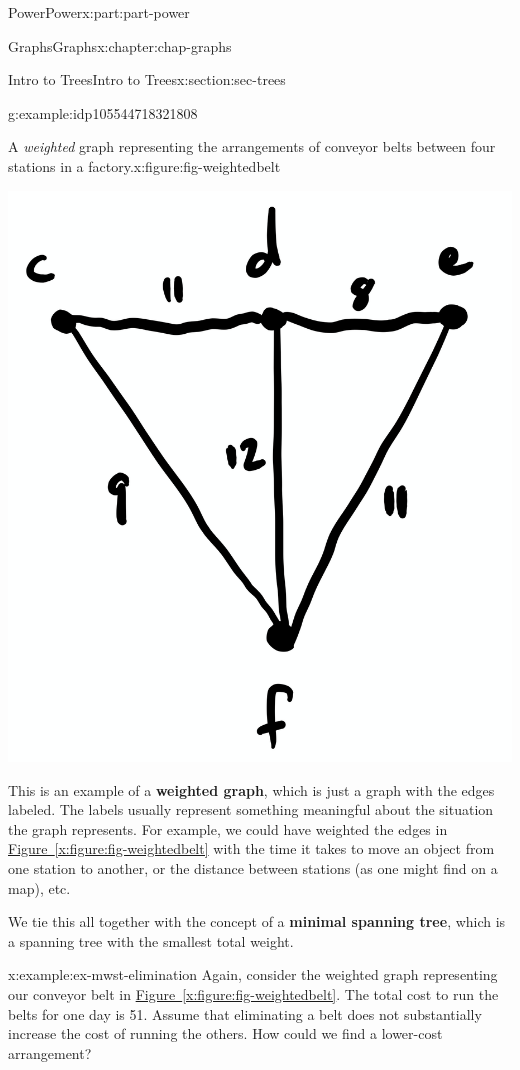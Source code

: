 \documentclass[oneside,10pt,]{book}
\newcommand{\xreffont}{\relax}
\newcommand{\terminology}[1]{\textbf{#1}}
\numberwithin{equation}{section}
\begin{document}
\begin{partptx}{Power}{}{Power}{}{}{x:part:part-power}
\begin{chapterptx}{Graphs}{}{Graphs}{}{}{x:chapter:chap-graphs}
\begin{sectionptx}{Intro to Trees}{}{Intro to Trees}{}{}{x:section:sec-trees}
\begin{example}{}{g:example:idp105544718321808}
\begin{figureptx}{A \emph{weighted} graph representing the arrangements of conveyor belts between four stations in a factory.}{x:figure:fig-weightedbelt}{}
\begin{image}{0.25}{0.5}{0.25}
\includegraphics[width=\linewidth]{images/graph05.png}
\end{image}%
\tcblower
\end{figureptx}%
This is an example of a \terminology{weighted graph}, which is just a graph with the edges labeled. The labels usually represent something meaningful about the situation the graph represents. For example, we could have weighted the edges in \hyperref[x:figure:fig-weightedbelt]{Figure~{\xreffont\ref{x:figure:fig-weightedbelt}}} with the time it takes to move an object from one station to another, or the distance between stations (as one might find on a map), etc.%
\end{example}
We tie this all together with the concept of a \terminology{minimal spanning tree}, which is a spanning tree with the smallest total weight.%
\begin{example}{}{x:example:ex-mwst-elimination}%
Again, consider the weighted graph representing our conveyor belt in \hyperref[x:figure:fig-weightedbelt]{Figure~{\xreffont\ref{x:figure:fig-weightedbelt}}}. The total cost to run the belts for one day is \textdollar{}51. Assume that eliminating a belt does not substantially increase the cost of running the others. How could we find a lower-cost arrangement?%

\end{example}
\end{sectionptx}
\end{chapterptx}
\end{partptx}
\end{document}
